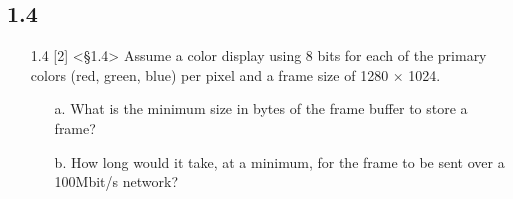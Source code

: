 \documentclass{article}
\begin{document}

\subsection*{1.4}
\begin{enumerate}
    \item[1.4] [2] <§1.4> Assume a color display using 8 bits for each of the primary colors (red, green, blue) per pixel and a frame size of 1280 × 1024.
    \begin{enumerate}
        \item[a.] What is the minimum size in bytes of the frame buffer to store a frame?
        \item[b.] How long would it take, at a minimum, for the frame to be sent over a 100Mbit/s network?
    \end{enumerate}
\end{enumerate}

\end{document}
